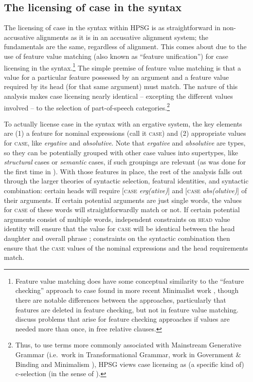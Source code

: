 \documentclass[output=paper
 	        ,biblatex
                ,babelshorthands
                ,newtxmath
                ,draftmode
                ,colorlinks, citecolor=brown
]{langscibook}
\begin{document}
\subsection{The licensing of case in the syntax}

The licensing of case in the syntax within HPSG is as straightforward in non-accusative alignments
as it is in an accusative alignment system; the fundamentals are the same, regardless of
alignment. This comes about due to the use of feature value matching (also known as ``feature
unification'') for case licensing in the syntax.\footnote{Feature value matching does have some
  conceptual similarity to the ``feature checking'' approach to case found in more recent Minimalist
  work \citep{Chomsky91a-u,Chomsky93b-u,adger2000,Adger2010a,framgut06,pestor07}\iaddpages, though
  there are notable differences between the approaches, particularly that features are deleted in
  feature checking, but not in feature value
  matching.  discuss
  problems that arise for feature checking approaches if values are needed more than once, \eg in
  free relative clauses. } The simple premise of feature value matching is that a value for a
particular feature possessed by an argument and a feature value required by its head (for that same
argument) must match. The nature of this analysis makes case licensing nearly identical -- excepting
the different values involved -- to the selection of part-of-speech categories.\footnote{Thus, to
  use terms more commonly associated with Mainstream Generative Grammar (i.e.\ work in
  Transformational Grammar, \eg work in Government \& Binding and Minimalism \citealt{Chomsky81a,Chomsky95a-u}), HPSG views case licensing as (a
  specific kind of) c-selection (in the sense of \citealt{Grimshaw79a-u}).}

To actually license case in the syntax with an ergative system, the key elements are (1) a feature for nominal expressions (call it \textsc{case}) and (2) appropriate values for \textsc{case}, like \textit{ergative} and \textit{absolutive}. Note that \textit{ergative} and \textit{absolutive} are types, so they can be potentially grouped with other case values into supertypes, like \textit{structural} cases or \textit{semantic} cases, if such groupings are relevant (as was done for the first time in \citealt[]{HM94a}). With those features in place, the rest of the analysis falls out through the larger theories of syntactic selection, featural identities, and syntactic combination: certain heads will require [\textsc{case} \textit{erg(ative)}] and [\textsc{case} \textit{abs(olutive)}] of their arguments. If certain potential arguments are just single words, the values for \textsc{case} of these words will straightforwardly match or not. If certain potential arguments consist of multiple words, independent constraints on \textsc{head} value identity will ensure that the value for \textsc{case} will be identical between the head daughter and overall phrase \crossrefchapterp[\pageref{page-hfp}]{properties}; constraints on the syntactic combination then ensure that the \textsc{case} values of the nominal expressions and the head requirements match. 
\end{document}
